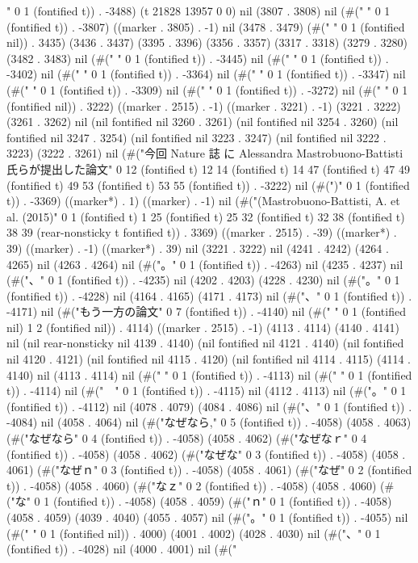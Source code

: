 " 0 1 (fontified t)) . -3488) (t 21828 13957 0 0) nil (3807 . 3808) nil (#(" " 0 1 (fontified t)) . -3807) ((marker . 3805) . -1) nil (3478 . 3479) (#(" " 0 1 (fontified nil)) . 3435) (3436 . 3437) (3395 . 3396) (3356 . 3357) (3317 . 3318) (3279 . 3280) (3482 . 3483) nil (#("
" 0 1 (fontified t)) . -3445) nil (#("
" 0 1 (fontified t)) . -3402) nil (#("
" 0 1 (fontified t)) . -3364) nil (#("
" 0 1 (fontified t)) . -3347) nil (#("
" 0 1 (fontified t)) . -3309) nil (#("
" 0 1 (fontified t)) . -3272) nil (#(" " 0 1 (fontified nil)) . 3222) ((marker . 2515) . -1) ((marker . 3221) . -1) (3221 . 3222) (3261 . 3262) nil (nil fontified nil 3260 . 3261) (nil fontified nil 3254 . 3260) (nil fontified nil 3247 . 3254) (nil fontified nil 3223 . 3247) (nil fontified nil 3222 . 3223) (3222 . 3261) nil (#("今回 Nature 誌
に Alessandra Mastrobuono-Battisti 氏らが提出した論文" 0 12 (fontified t) 12 14 (fontified t) 14 47 (fontified t) 47 49 (fontified t) 49 53 (fontified t) 53 55 (fontified t)) . -3222) nil (#(")" 0 1 (fontified t)) . -3369) ((marker*) . 1) ((marker) . -1) nil (#("(Mastrobuono-Battisti, A. et al. (2015)" 0 1 (fontified t) 1 25 (fontified t) 25 32 (fontified t) 32 38 (fontified t) 38 39 (rear-nonsticky t fontified t)) . 3369) ((marker . 2515) . -39) ((marker*) . 39) ((marker) . -1) ((marker*) . 39) nil (3221 . 3222) nil (4241 . 4242) (4264 . 4265) nil (4263 . 4264) nil (#("。" 0 1 (fontified t)) . -4263) nil (4235 . 4237) nil (#("、" 0 1 (fontified t)) . -4235) nil (4202 . 4203) (4228 . 4230) nil (#("。" 0 1 (fontified t)) . -4228) nil (4164 . 4165) (4171 . 4173) nil (#("、" 0 1 (fontified t)) . -4171) nil (#("もう一方の論文" 0 7 (fontified t)) . -4140) nil (#("  " 0 1 (fontified nil) 1 2 (fontified nil)) . 4114) ((marker . 2515) . -1) (4113 . 4114) (4140 . 4141) nil (nil rear-nonsticky nil 4139 . 4140) (nil fontified nil 4121 . 4140) (nil fontified nil 4120 . 4121) (nil fontified nil 4115 . 4120) (nil fontified nil 4114 . 4115) (4114 . 4140) nil (4113 . 4114) nil (#("
" 0 1 (fontified t)) . -4113) nil (#("
" 0 1 (fontified t)) . -4114) nil (#("　" 0 1 (fontified t)) . -4115) nil (4112 . 4113) nil (#("。" 0 1 (fontified t)) . -4112) nil (4078 . 4079) (4084 . 4086) nil (#("、" 0 1 (fontified t)) . -4084) nil (4058 . 4064) nil (#("なぜなら," 0 5 (fontified t)) . -4058) (4058 . 4063) (#("なぜなら" 0 4 (fontified t)) . -4058) (4058 . 4062) (#("なぜなｒ" 0 4 (fontified t)) . -4058) (4058 . 4062) (#("なぜな" 0 3 (fontified t)) . -4058) (4058 . 4061) (#("なぜｎ" 0 3 (fontified t)) . -4058) (4058 . 4061) (#("なぜ" 0 2 (fontified t)) . -4058) (4058 . 4060) (#("なｚ" 0 2 (fontified t)) . -4058) (4058 . 4060) (#("な" 0 1 (fontified t)) . -4058) (4058 . 4059) (#("ｎ" 0 1 (fontified t)) . -4058) (4058 . 4059) (4039 . 4040) (4055 . 4057) nil (#("。" 0 1 (fontified t)) . -4055) nil (#(" " 0 1 (fontified nil)) . 4000) (4001 . 4002) (4028 . 4030) nil (#("、" 0 1 (fontified t)) . -4028) nil (4000 . 4001) nil (#("
